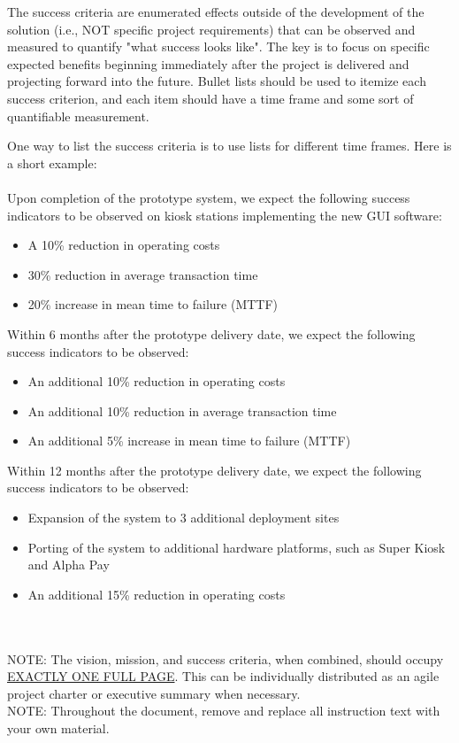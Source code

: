 The success criteria are enumerated effects outside of the development of the solution (i.e., NOT specific project requirements) that can be observed and measured to quantify "what success looks like". The key is to focus on specific expected benefits beginning immediately after the project is delivered and projecting forward into the future. Bullet lists should be used to itemize each success criterion, and each item should have a time frame and some sort of quantifiable measurement.

One way to list the success criteria is to use lists for different time frames. Here is a short example:
\\
\\
Upon completion of the prototype system, we expect the following success indicators to be observed on kiosk stations implementing the new GUI software:
\begin{itemize}
  \item A 10\% reduction in operating costs
  \item 30\% reduction in average transaction time
  \item 20\% increase in mean time to failure (MTTF)
\end{itemize}

Within 6 months after the prototype delivery date, we expect the following success indicators to be observed:
\begin{itemize}
  \item An additional 10\% reduction in operating costs
  \item An additional 10\% reduction in average transaction time
  \item An additional 5\% increase in mean time to failure (MTTF)
\end{itemize}

Within 12 months after the prototype delivery date, we expect the following success indicators to be observed:
\begin{itemize}
  \item Expansion of the system to 3 additional deployment sites
  \item Porting of the system to additional hardware platforms, such as Super Kiosk and Alpha Pay
  \item An additional 15\% reduction in operating costs
\end{itemize}
~\\
~\\
NOTE: The vision, mission, and success criteria, when combined, should occupy \underline{EXACTLY ONE FULL PAGE}. This can be individually distributed as an agile project charter or executive summary when necessary. 
\\
NOTE: Throughout the document, remove and replace all instruction text with your own material. 
